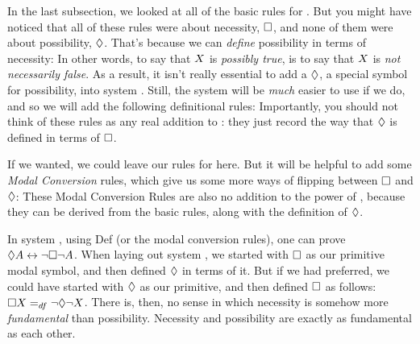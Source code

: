 In the last subsection, we looked at all of the basic rules for \mlK. But you might have noticed that all of these rules were about necessity, $\Box$, and none of them were about possibility, $\Diamond$. That's because we can \emph{define} possibility in terms of necessity:
In other words, to say that $X$ is \emph{possibly true}, is to say that $X$ is \emph{not necessarily false}. As a result, it isn't really essential to add a $\Diamond$, a special symbol for possibility, into system \mlK. Still, the system will be \emph{much} easier to use if we do, and so we will add the following definitional rules:
Importantly, you should not think of these rules as any real addition to \mlK: they just record the way that $\Diamond$ is defined in terms of $\Box$.

If we wanted, we could leave our rules for \mlK{} here. But it will be helpful to add some \emph{Modal Conversion} rules, which give us some more ways of flipping between $\Box$ and $\Diamond$:
These Modal Conversion Rules are also no addition to the power of \mlK, because they can be derived from the basic rules, along with the definition of $\Diamond$.

In system \mlK, using Def\ediamond{} (or the modal conversion rules), one can prove $\Diamond A \leftrightarrow \neg\Box\neg A$. When laying out system \mlK, we started with $\Box$ as our primitive modal symbol, and then defined $\Diamond$ in terms of it. But if we had preferred, we could have started with $\Diamond$ as our primitive, and then defined $\Box$ as follows: $\Box X =_{df} \neg \Diamond \neg X$. There is, then, no sense in which necessity is somehow more \emph{fundamental} than possibility. Necessity and possibility are exactly as fundamental as each other.

